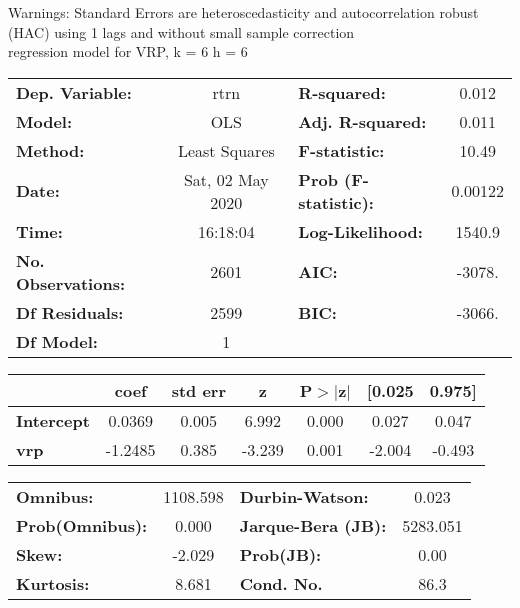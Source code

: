 Warnings: \newline
 [1] Standard Errors are heteroscedasticity and autocorrelation robust (HAC) using 1 lags and without small sample correction\\ 

regression model for VRP, k = 6 h = 6\begin{center}
\begin{tabular}{lclc}
\toprule
\textbf{Dep. Variable:}    &       rtrn       & \textbf{  R-squared:         } &     0.012   \\
\textbf{Model:}            &       OLS        & \textbf{  Adj. R-squared:    } &     0.011   \\
\textbf{Method:}           &  Least Squares   & \textbf{  F-statistic:       } &     10.49   \\
\textbf{Date:}             & Sat, 02 May 2020 & \textbf{  Prob (F-statistic):} &  0.00122    \\
\textbf{Time:}             &     16:18:04     & \textbf{  Log-Likelihood:    } &    1540.9   \\
\textbf{No. Observations:} &        2601      & \textbf{  AIC:               } &    -3078.   \\
\textbf{Df Residuals:}     &        2599      & \textbf{  BIC:               } &    -3066.   \\
\textbf{Df Model:}         &           1      & \textbf{                     } &             \\
\bottomrule
\end{tabular}
\begin{tabular}{lcccccc}
                   & \textbf{coef} & \textbf{std err} & \textbf{z} & \textbf{P$> |$z$|$} & \textbf{[0.025} & \textbf{0.975]}  \\
\midrule
\textbf{Intercept} &       0.0369  &        0.005     &     6.992  &         0.000        &        0.027    &        0.047     \\
\textbf{vrp}       &      -1.2485  &        0.385     &    -3.239  &         0.001        &       -2.004    &       -0.493     \\
\bottomrule
\end{tabular}
\begin{tabular}{lclc}
\textbf{Omnibus:}       & 1108.598 & \textbf{  Durbin-Watson:     } &    0.023  \\
\textbf{Prob(Omnibus):} &   0.000  & \textbf{  Jarque-Bera (JB):  } & 5283.051  \\
\textbf{Skew:}          &  -2.029  & \textbf{  Prob(JB):          } &     0.00  \\
\textbf{Kurtosis:}      &   8.681  & \textbf{  Cond. No.          } &     86.3  \\
\bottomrule
\end{tabular}
\end{center}

